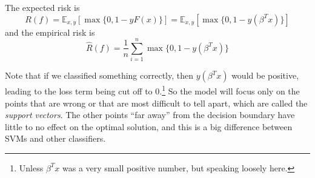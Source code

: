   \begin{theorem}[Risk]
    The expected risk is 
    \begin{equation}
      R(f) = \mathbb{E}_{x, y} \left[ \max\{0, 1 - y F(x) \}\right] = \mathbb{E}_{x, y} \left[ \max\{0, 1 - y (\beta^T x) \}\right]
    \end{equation}
    and the empirical risk is 
    \begin{equation}
      \hat{R}(f) = \frac{1}{n} \sum_{i=1}^n \max\{0, 1 - y (\beta^T x) \}
    \end{equation}
  \end{theorem}
  
  Note that if we classified something correctly, then $y(\beta^T x)$ would be positive, leading to the loss term being cut off to $0$.\footnote{Unless $\beta^T x$ was a very small positive number, but speaking loosely here.} So the model will focus only on the points that are wrong or that are most difficult to tell apart, which are called the \textit{support vectors}. The other points ``far away'' from the decision boundary have little to no effect on the optimal solution, and this is a big difference between SVMs and other classifiers. 

